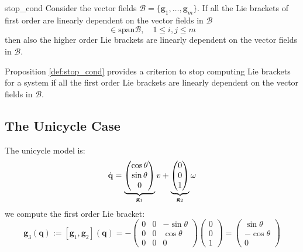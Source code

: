 \documentclass[10pt, a4paper]{report}
\newcommand{\q}{{\mathbf q}}
\begin{document}
\begin{boxproposition}{}{stop_cond}
    Consider the vector fields $\mathcal B=\{\mathbf g_1,\dots,\mathbf g_m\}$. If all the Lie brackets of first order are linearly dependent on the vector fields in $\mathcal B$\begin{equation}
         [\mathbf g_i,\mathbf g_j]\in\text{span}\mathcal B, \quad 1\le i,j\le m
    \end{equation}
    then also the higher order Lie brackets are linearly dependent on the vector fields in $\mathcal B$.
\end{boxproposition}  
\noindent Proposition \ref{def:stop_cond} provides a criterion to stop computing Lie brackets for a system if all the first order Lie brackets are linearly dependent on the vector fields in $\mathcal B$.
\subsection{The Unicycle Case}
The unicycle model is:\begin{equation}
    {\dot{\mathbf q}}=\underbrace{\begin{pmatrix}
        \cos\theta\\\sin\theta\\0 
    \end{pmatrix}}_{\mathbf g_1}v+\underbrace{\begin{pmatrix}
        0\\0\\1  
    \end{pmatrix}}_{\mathbf g_2}\omega
\end{equation}
we compute the first order Lie bracket:\begin{equation}
    \mathbf g_3(\q):=[\mathbf g_1,\mathbf g_2](\q)=-\begin{pmatrix}
        0&0&-\sin\theta\\ 
        0&0&\cos\theta \\ 
        0&0&0
    \end{pmatrix}\begin{pmatrix}
        0\\0\\1 
    \end{pmatrix}=\begin{pmatrix}
       \sin\theta\\-\cos\theta\\ 0
    \end{pmatrix}
\end{equation}
\end{document}
